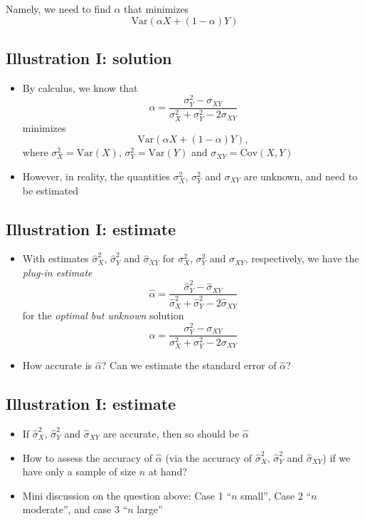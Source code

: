 \documentclass[]{article}
\providecommand{\tightlist}{%
  \setlength{\itemsep}{0pt}\setlength{\parskip}{0pt}}
\begin{document}
Namely, we need to find \(\alpha\) that minimizes
\[\textrm{Var}(\alpha X + (1-\alpha)Y)\]

\subsection{Illustration I: solution}\label{illustration-i-solution}

\begin{itemize}
\item
  By calculus, we know that \[
  \alpha=\frac{\sigma_{Y}^{2}-\sigma_{XY}}{\sigma_{X}^{2}+\sigma_{Y}^{2}-2\sigma_{XY}}
  \] minimizes \[\textrm{Var}(\alpha X + (1-\alpha)Y),\] where
  \(\sigma_{X}^{2}=\textrm{Var}(X)\), \(\sigma_{Y}^{2}=\textrm{Var}(Y)\)
  and \(\sigma_{XY}=\textrm{Cov}(X,Y)\)
\item
  However, in reality, the quantities \(\sigma_{X}^{2}\),
  \(\sigma_{Y}^{2}\) and \(\sigma_{XY}\) are unknown, and need to be
  estimated
\end{itemize}

\subsection{Illustration I: estimate}\label{illustration-i-estimate}

\begin{itemize}
\tightlist
\item
  With estimates \(\hat{\sigma}_{X}^{2}\), \(\hat{\sigma}_{Y}^{2}\) and
  \(\hat{\sigma}_{XY}\) for \(\sigma_{X}^{2}\), \(\sigma_{Y}^{2}\) and
  \(\sigma_{XY}\), respectively, we have the \emph{plug-in estimate}
  \[\hat{\alpha}=\frac{\hat{\sigma}_{Y}^{2}-\hat{\sigma}_{XY}}{\hat{\sigma}_{X}^{2}+\hat{\sigma}_{Y}^{2}-2\hat{\sigma}_{XY}}\]
  for the \emph{optimal but unknown} solution \[
  \alpha=\frac{\sigma_{Y}^{2}-\sigma_{XY}}{\sigma_{X}^{2}+\sigma_{Y}^{2}-2\sigma_{XY}}
  \]
\item
  How accurate is \(\hat{\alpha}\)? Can we estimate the standard error
  of \(\hat{\alpha}\)?
\end{itemize}

\subsection{Illustration I: estimate}\label{illustration-i-estimate-1}

\begin{itemize}
\item
  If \(\hat{\sigma}_{X}^{2}\), \(\hat{\sigma}_{Y}^{2}\) and
  \(\hat{\sigma}_{XY}\) are accurate, then so should be \(\hat{\alpha}\)
\item
  How to assess the accuracy of \(\hat{\alpha}\) (via the accuracy of
  \(\hat{\sigma}_{X}^{2}\), \(\hat{\sigma}_{Y}^{2}\) and
  \(\hat{\sigma}_{XY}\)) if we have only a sample of size \(n\) at hand?
\item
  Mini discussion on the question above: Case 1 ``\(n\) small'', Case 2
  ``\(n\) moderate'', and case 3 ``\(n\) large''
\end{itemize}
\end{document}
